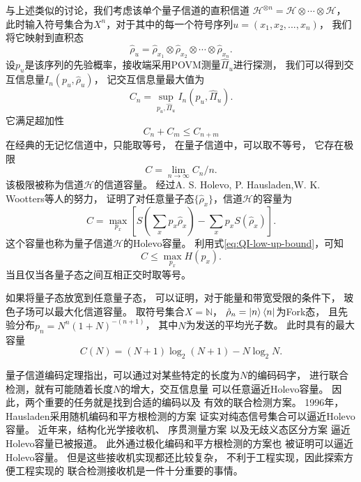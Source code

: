 与上述类似的讨论，我们考虑该单个量子信道的直积信道
$\mathcal{H}^{\otimes n}=\mathcal{H}\otimes\cdots \otimes \mathcal{H}$，
此时输入符号集合为$X^n$，对于其中的每一个符号序列$u = (x_1, x_2, ..., x_n)$，
我们将它映射到直积态
\begin{equation}
\hat{\rho}_u = \hat{\rho}_{x_1}\otimes \hat{\rho}_{x_2}\otimes \cdots \otimes \hat{\rho}_{x_n}.
\end{equation}
设$p_u$是该序列的先验概率，接收端采用POVM测量$\hat{\Pi}_u$进行探测，
我们可以得到交互信息量$I_n(p_u, \hat{\rho}_u)$，
记交互信息量最大值为
\begin{equation}
C_n= \sup_{p_u,\hat{\Pi}_u} I_n(p_u, \hat{\Pi}_u).
\end{equation}
它满足超加性
\begin{equation}
C_n + C_m \le C_{n+m}
\end{equation}
在经典的无记忆信道中，只能取等号，
在量子信道中，可以取不等号，
它存在极限
\begin{equation}
C = \lim_{n \rightarrow \infty} C_n / n.
\end{equation}
该极限被称为信道$\mathcal{H}$的信道容量。
经过A. S. Holevo, P. Hausladen,W. K. Wootters等人的努力，
证明了对任意量子态$\{\hat{\rho}_x\}$，信道$\mathcal{H}$的容量为\cite{holevo1973bounds,hausladen1996classical, holevo1996capacity}
\begin{equation}
C = \max_{p_x}\left[ S(\sum_x p_x \hat{\rho}_x) - \sum_x p_x S( \hat{\rho}_x) \right].
\end{equation}
这个容量也称为量子信道$\mathcal{H}$的Holevo容量。
利用式\ref{eq:QI-low-up-bound}，可知
\begin{equation}
C \le \max_{p_x}H(p_x).
\end{equation}
当且仅当各量子态之间互相正交时取等号。

如果将量子态放宽到任意量子态，
可以证明，对于能量和带宽受限的条件下，
玻色子场可以最大化信道容量\cite{yuen1993ultimate}。
取符号集合$X = \mathbb{N}$，
$\hat{\rho}_n = \ket{n}\bra{n}$为Fork态，
且先验分布$p_n= N^n(1+N)^{-(n+1)}$，
其中$N$为发送的平均光子数。
此时具有的最大容量
\begin{equation}
C(N) = (N+1)\log_2(N+1) -N \log_2 N.
\label{eq:Boson-capacity}
\end{equation}


量子信道编码定理指出，可以通过对某些特定的长度为$N$的编码码字，
进行联合检测，就有可能随着长度$N$的增大，交互信息量
可以任意逼近Holevo容量\cite{hausladen1996classical, holevo1996capacity}。
因此，两个重要的任务就是找到合适的编码以及
有效的联合检测方案。
1996年，Hausladen采用随机编码和平方根检测的方案
证实对纯态信号集合可以逼近Holevo容量。
近年来，结构化光学接收机\cite{guha2011structured}、
序贯测量方案\cite{giovannetti2012achieving}
以及无歧义态区分方案\cite{takeoka2013achieving}
逼近Holevo容量已被报道。
此外通过极化编码和平方根检测的方案也
被证明可以逼近Holevo容量\cite{guha2012polar}。
但是这些接收机实现都还比较复杂，
不利于工程实现，因此探索方便工程实现的
联合检测接收机是一件十分重要的事情。



